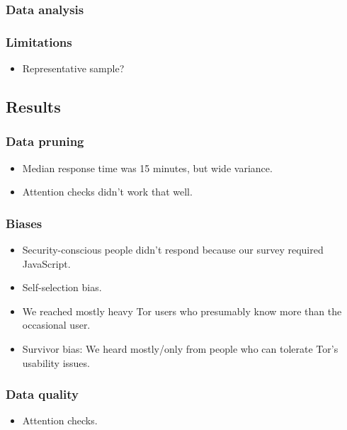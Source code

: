 \subsubsection{Data analysis}

\subsubsection{Limitations}
\begin{itemize}
    \item Representative sample?
\end{itemize}

\subsection{Results}
\label{sec:results}

\subsubsection{Data pruning}
\begin{itemize}
    \item Median response time was 15 minutes, but wide variance.
    \item Attention checks didn't work that well.
\end{itemize}

\subsubsection{Biases}
\begin{itemize}
    \item Security-conscious people didn't respond because our survey required
        JavaScript.
    \item Self-selection bias.
    \item We reached mostly heavy Tor users who presumably know more than the
        occasional user.
    \item Survivor bias: We heard mostly/only from people who can tolerate Tor's
        usability issues.
\end{itemize}

\subsubsection{Data quality}
\begin{itemize}
    \item Attention checks.
\end{itemize}

